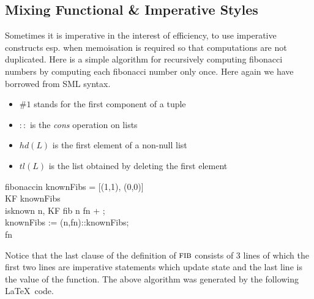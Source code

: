 \documentclass[a4]{article}
\begin{document}
\subsection{Mixing Functional \& Imperative Styles}

Sometimes it is imperative in the interest of efficiency, to use
imperative constructs esp. when memoisation is required so that
computations are not duplicated.  Here is a simple  algorithm
for recursively computing fibonacci numbers by computing each
fibonacci number only once. Here again we have borrowed from SML
syntax.
\begin{itemize}
\item $\#1$ stands for the first component of a tuple 
\item $::$ is the {\em cons} operation on lists
\item $hd (L)$ is the first element of a non-null list
\item $tl(L)$ is the list obtained by deleting the first element
\end{itemize}

\begin{pseudocode}{fibonacci}{n}
  \BEGIN
    \GLOBAL knownFibs = [(1,1), (0,0)]\\
    \LET
    KF \GETS knownFibs\\
    \REC \FUN
       {isknown} {n, KF}
       \BEGIN
          \CASES
          \ENDCASES
       \END
    \ENDFUN
    \REC \FUN
         {fib} {n}
         \BEGIN
           \CASES
               {\BEGIN
                fn \GETS {} + ; \\ 
                knownFibs := (n,fn)::knownFibs; \\
                fn
                \END}
           \ENDCASES
         \END
         \ENDFUN
   \IN\\
  \END
\end{pseudocode}

Notice that the last clause of the definition of $\textsc{fib}$
consists of 3 lines of which the first two lines are imperative
statements which update state and the last line is the value of the
function. The above algorithm was generated by the following
\LaTeX\ code.
\end{document}
